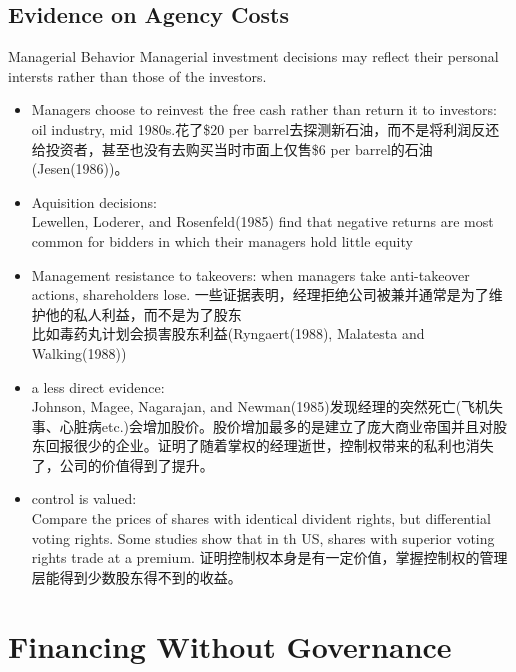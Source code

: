 \subsection{Evidence on Agency Costs}

	\begin{frame}{Managerial Behavior}
		Managerial investment decisions may reflect their personal intersts rather than those of the investors.
		\begin{itemize}
		\item Managers choose to reinvest the free cash rather than return it to investors: \\
		oil industry, mid 1980s.花了\$20 per barrel去探测新石油，而不是将利润反还给投资者，甚至也没有去购买当时市面上仅售\$6 per barrel的石油(Jesen(1986))。
		\item Aquisition decisions: \\
			Lewellen, Loderer, and Rosenfeld(1985) find that negative returns are most common for bidders in which their managers hold little equity
	\end{itemize}	
\end{frame}			
			
		\begin{frame}
		\begin{itemize}
		\item Management resistance to takeovers: when managers take anti-takeover actions, shareholders lose. 一些证据表明，经理拒绝公司被兼并通常是为了维护他的私人利益，而不是为了股东\\
		比如毒药丸计划会损害股东利益(Ryngaert(1988), Malatesta and Walking(1988))
		\item a less direct evidence:\\
			Johnson, Magee, Nagarajan, and Newman(1985)发现经理的突然死亡(飞机失事、心脏病etc.)会增加股价。股价增加最多的是建立了庞大商业帝国并且对股东回报很少的企业。证明了随着掌权的经理逝世，控制权带来的私利也消失了，公司的价值得到了提升。
		\item control is valued:\\
			Compare the prices of shares with identical divident rights, but differential voting rights. Some studies show that in th US, shares with superior voting rights trade at a premium. 证明控制权本身是有一定价值，掌握控制权的管理层能得到少数股东得不到的收益。
		\end{itemize}

\end{frame}

\section{Financing Without Governance}%

